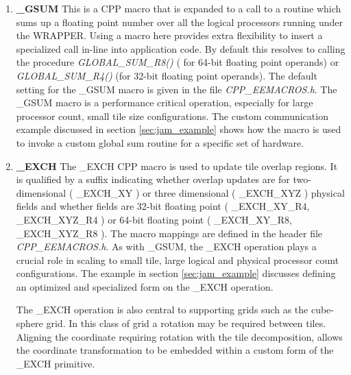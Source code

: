 \begin{enumerate}
\item {\bf \_GSUM}
This is a CPP macro that is expanded to a call to a routine
which sums up a floating point number
over all the logical processors running under the
WRAPPER. Using a macro here provides extra flexibility to insert
a specialized call in-line into application code. By default this
resolves to calling the procedure {\em GLOBAL\_SUM\_R8()} ( for
64-bit floating point operands)
or {\em GLOBAL\_SUM\_R4()} (for 32-bit floating point operands). The default
setting for the \_GSUM macro is given in the file {\em CPP\_EEMACROS.h}.
The \_GSUM macro is a performance critical operation, especially for
large processor count, small tile size configurations.
The custom communication example discussed in section \ref{sec:jam_example}
shows how the macro is used to invoke a custom global sum routine
for a specific set of hardware.

\item {\bf \_EXCH}
The \_EXCH CPP macro is used to update tile overlap regions.
It is qualified by a suffix indicating whether overlap updates are for
two-dimensional ( \_EXCH\_XY ) or three dimensional ( \_EXCH\_XYZ )
physical fields and whether fields are 32-bit floating point
( \_EXCH\_XY\_R4, \_EXCH\_XYZ\_R4 ) or 64-bit floating point
( \_EXCH\_XY\_R8, \_EXCH\_XYZ\_R8 ). The macro mappings are defined
in the header file {\em CPP\_EEMACROS.h}. As with \_GSUM, the 
\_EXCH operation plays a crucial role in scaling to small tile,
large logical and physical processor count configurations.
The example in section \ref{sec:jam_example} discusses defining an
optimized and specialized form on the \_EXCH operation.

The \_EXCH operation is also central to supporting grids such as
the cube-sphere grid. In this class of grid a rotation may be required
between tiles. Aligning the coordinate requiring rotation with the
tile decomposition, allows the coordinate transformation to 
be embedded within a custom form of the \_EXCH primitive.


\end{enumerate}
